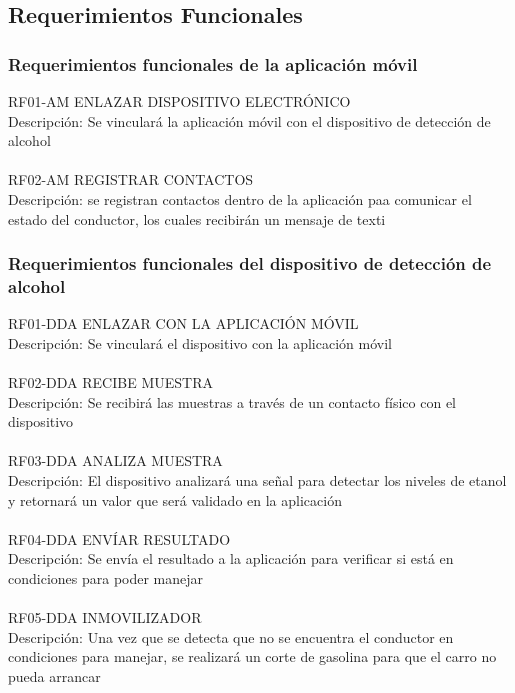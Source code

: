 \subsection{Requerimientos Funcionales} 

  \subsubsection{Requerimientos funcionales de la aplicación móvil}
  
  
  RF01-AM   ENLAZAR DISPOSITIVO ELECTRÓNICO
  \\Descripción: Se vinculará la aplicación móvil con el dispositivo de detección de alcohol
  \\ \\RF02-AM   REGISTRAR CONTACTOS
  \\Descripción: se registran contactos dentro de la aplicación paa comunicar el estado del conductor, 
  los cuales recibirán un mensaje de texti
  
  
  \subsubsection{Requerimientos funcionales del dispositivo de detección de alcohol}
  
  RF01-DDA  ENLAZAR CON LA APLICACIÓN MÓVIL
  \\Descripción: Se vinculará el dispositivo con la aplicación móvil
  \\ \\RF02-DDA  RECIBE MUESTRA
  \\Descripción: Se recibirá las muestras a través de un contacto físico con el dispositivo
  \\ \\RF03-DDA  ANALIZA MUESTRA
  \\Descripción: El dispositivo analizará una señal para detectar los niveles de etanol y retornará un 
  valor que será validado en la aplicación
  \\ \\RF04-DDA  ENVÍAR RESULTADO
  \\Descripción: Se envía el resultado a la aplicación para verificar si está en condiciones para poder manejar
  \\ \\RF05-DDA  INMOVILIZADOR
  \\Descripción: Una vez que se detecta que no se encuentra el conductor en condiciones para manejar, se realizará
  un corte de gasolina para que el carro no pueda arrancar
  

